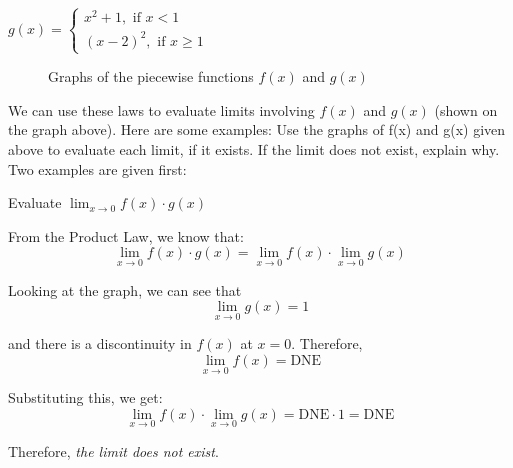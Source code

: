 $g(x) = \begin{cases}
   x^2+1, \text{ if } x < 1 \\
    (x-2)^2, \text{ if } x \geq 1
\end{cases}$

\begin{figure}[H]
\centering
{}
\caption{Graphs of the piecewise functions $f(x)$ and $g(x)$}
\end{figure}
We can use these laws to evaluate limits involving $f(x)$ and $g(x)$ (shown on the 
graph above). Here are some examples:
Use the graphs of f(x) and g(x) given above to evaluate each limit, if it exists. 
If the limit does not exist, explain why. Two examples are given first:

\begin{Worked}
\begin{Problem}
Evaluate $\lim_{x\to0} f(x) \cdot g(x)$
\end{Problem}
\begin{Solution}
From the Product Law, we know that:
$$\lim_{x\to0} f(x) \cdot g(x) = \lim_{x\to0}f(x) \cdot \lim_{x\to0} g(x)$$

Looking at the graph, we can see that 
$$\lim_{x\to0}g(x) = 1$$ 

and there is a discontinuity in $f(x)$ at $x=0$. Therefore, 
$$\lim_{x\to0}f(x) = \text{DNE}$$

Substituting this, we get: 
$$\lim_{x\to0}f(x) \cdot \lim_{x\to0} g(x) = \text{DNE} \cdot 1 = \text{DNE}$$

Therefore, \textit{the limit does not exist}. 
\end{Solution}
\end{Worked}

